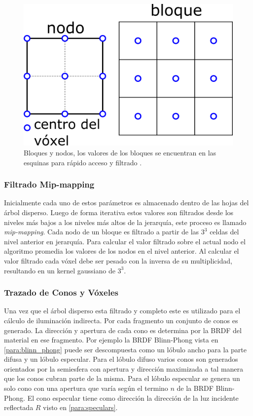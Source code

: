 \begin{figure}[H]
	\centering
	\includegraphics[width=0.3\linewidth]{media/bricks_vct.png}
	\caption{Bloques y nodos, los valores de los bloques se encuentran en las esquinas para rápido acceso y filtrado \cite{CNSGE11b}.}
	\label{fig:bricks_vct}
\end{figure}

\subsubsection{Filtrado Mip-mapping}
\label{subsub:mipmaping_orig}
Inicialmente cada uno de estos parámetros es almacenado dentro de las hojas del árbol disperso. Luego de forma iterativa estos valores son filtrados desde los niveles más bajos a los niveles más altos de la jerarquía, este proceso es llamado \emph{mip-mapping}. Cada nodo de un bloque es filtrado a partir de las $3^3$ celdas del nivel anterior en jerarquía. Para calcular el valor filtrado sobre el actual nodo el algoritmo promedia los valores de los nodos en el nivel anterior. Al calcular el valor filtrado cada vóxel debe ser pesado con la inversa de su multiplicidad, resultando en un kernel gaussiano de $3^3$. 

\subsubsection{Trazado de Conos y Vóxeles}
Una vez que el árbol disperso esta filtrado y completo este es utilizado para el cálculo de iluminación indirecta. Por cada fragmento un conjunto de conos es generado. La dirección y apertura de cada cono es determina por la \ac{BRDF} del material en ese fragmento. Por ejemplo la \ac{BRDF} Blinn-Phong vista en \ref{para:blinn_phong} puede ser descompuesta como un lóbulo ancho para la parte difusa y un lóbulo especular. Para el lóbulo difuso varios conos son generados orientados por la semiesfera con apertura y dirección maximizada a tal manera que los conos cubran parte de la misma. Para el lóbulo especular se genera un solo cono con una apertura que varía según el termino $n$ de la \ac{BRDF} Blinn-Phong. El cono especular tiene como dirección la dirección de la luz incidente reflectada $R$ visto en \ref{para:speculars}.

